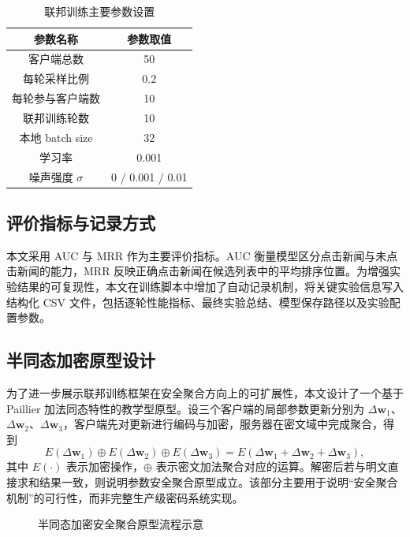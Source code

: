 \documentclass[UTF8,a4paper,12pt]{ctexart}
\numberwithin{equation}{section}
\begin{document}
\begin{table}[H]
\centering
\caption{联邦训练主要参数设置}
\small
\begin{tabular}{cc}
\toprule
参数名称 & 参数取值 \\
\midrule
客户端总数 & 50 \\
每轮采样比例 & 0.2 \\
每轮参与客户端数 & 10 \\
联邦训练轮数 & 10 \\
本地 batch size & 32 \\
学习率 & 0.001 \\
噪声强度 $\sigma$ & 0 / 0.001 / 0.01 \\
\bottomrule
\end{tabular}
\end{table}

\subsection{评价指标与记录方式}
本文采用 AUC 与 MRR 作为主要评价指标。AUC 衡量模型区分点击新闻与未点击新闻的能力，MRR 反映正确点击新闻在候选列表中的平均排序位置。为增强实验结果的可复现性，本文在训练脚本中增加了自动记录机制，将关键实验信息写入结构化 CSV 文件，包括逐轮性能指标、最终实验总结、模型保存路径以及实验配置参数。

\subsection{半同态加密原型设计}
为了进一步展示联邦训练框架在安全聚合方向上的可扩展性，本文设计了一个基于 Paillier 加法同态特性的教学型原型。设三个客户端的局部参数更新分别为 $\Delta \mathbf{w}_1$、$\Delta \mathbf{w}_2$、$\Delta \mathbf{w}_3$，客户端先对更新进行编码与加密，服务器在密文域中完成聚合，得到
\begin{equation}
E(\Delta \mathbf{w}_1) \oplus E(\Delta \mathbf{w}_2) \oplus E(\Delta \mathbf{w}_3)=E(\Delta \mathbf{w}_1+\Delta \mathbf{w}_2+\Delta \mathbf{w}_3),
\end{equation}
其中 $E(\cdot)$ 表示加密操作，$\oplus$ 表示密文加法聚合对应的运算。解密后若与明文直接求和结果一致，则说明参数安全聚合原型成立。该部分主要用于说明“安全聚合机制”的可行性，而非完整生产级密码系统实现。

\begin{figure}[H]
\centering
{}
\caption{半同态加密安全聚合原型流程示意}
\end{figure}
\end{document}

